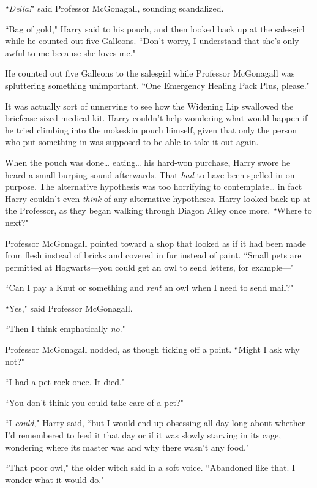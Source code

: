 ``\emph{Della!}" said Professor McGonagall, sounding scandalized.

``Bag of gold," Harry said to his pouch, and then looked back up at the salesgirl while he counted out five Galleons. ``Don't worry, I understand that she's only awful to me because she loves me."

He counted out five Galleons to the salesgirl while Professor McGonagall was spluttering something unimportant. ``One Emergency Healing Pack Plus, please."

It was actually sort of unnerving to see how the Widening Lip swallowed the briefcase-sized medical kit. Harry couldn't help wondering what would happen if he tried climbing into the mokeskin pouch himself, given that only the person who put something in was supposed to be able to take it out again.

When the pouch was done{\ldots} eating{\ldots} his hard-won purchase, Harry swore he heard a small burping sound afterwards. That \emph{had} to have been spelled in on purpose. The alternative hypothesis was too horrifying to contemplate{\ldots} in fact Harry couldn't even \emph{think} of any alternative hypotheses. Harry looked back up at the Professor, as they began walking through Diagon Alley once more. ``Where to next?"

Professor McGonagall pointed toward a shop that looked as if it had been made from flesh instead of bricks and covered in fur instead of paint. ``Small pets are permitted at Hogwarts—you could get an owl to send letters, for example—"

``Can I pay a Knut or something and \emph{rent} an owl when I need to send mail?"

``Yes," said Professor McGonagall.

``Then I think emphatically \emph{no}."

Professor McGonagall nodded, as though ticking off a point. ``Might I ask why not?"

``I had a pet rock once. It died."

``You don't think you could take care of a pet?"

``I \emph{could}," Harry said, ``but I would end up obsessing all day long about whether I'd remembered to feed it that day or if it was slowly starving in its cage, wondering where its master was and why there wasn't any food."

``That poor owl," the older witch said in a soft voice. ``Abandoned like that. I wonder what it would do."

